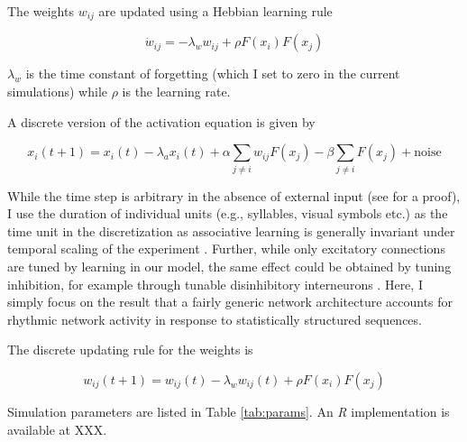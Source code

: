 \documentclass[
]{article}
\begin{document}
The weights \(w_{ij}\) are updated using a Hebbian learning rule

\[
\dot{w}_{ij} = - \lambda_w w_{ij} + \rho F(x_i) F(x_j) 
\]

\(\lambda_w\) is the time constant of forgetting (which I set to zero in
the current simulations) while \(\rho\) is the learning rate.

A discrete version of the activation equation is given by

\[
x_i (t+1) = x_i (t) - \lambda_a x_i(t) + \alpha \sum_{j \neq i} w_{ij} F(x_j) - \beta \sum_{j \neq i} F(x_j) + \text{noise}
\]

While the time step is arbitrary in the absence of external input (see
\citep{Endress-Catastrophic-Interference} for a proof), I use the
duration of individual units (e.g., syllables, visual symbols etc.) as
the time unit in the discretization as associative learning is generally
invariant under temporal scaling of the experiment
\citep{Gallistel2000PsychRev, Gallistel2001b}. Further, while only
excitatory connections are tuned by learning in our model, the same
effect could be obtained by tuning inhibition, for example through
tunable disinhibitory interneurons \citep{Letzkus2011}. Here, I simply
focus on the result that a fairly generic network architecture accounts
for rhythmic network activity in response to statistically structured
sequences.

The discrete updating rule for the weights is

\[
w_{ij} (t+1) = w_{ij} (t) - \lambda_w w_{ij} (t) + \rho F(x_i) F(x_j) 
\]

Simulation parameters are listed in Table \ref{tab:params}. An \emph{R}
implementation is available at XXX.
\end{document}
